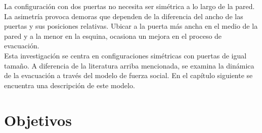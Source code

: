 La configuración con dos puertas no necesita ser simétrica a lo largo de la pared. La asimetría provoca demoras que dependen de la diferencia del ancho de las puertas y sus posiciones relativas. Ubicar a la puerta más ancha en el medio de la pared y a la menor en la esquina, ocasiona un mejora en el proceso de evacuación\cite{huanhuan1}.\\

Esta investigación se centra en configuraciones simétricas con puertas de igual tamaño. A diferencia de la literatura arriba mencionada, se examina la dinámica de la evacuación a través del modelo de fuerza social. En el capítulo siguiente se encuentra una descripción de este modelo. \\

\section{Objetivos}
